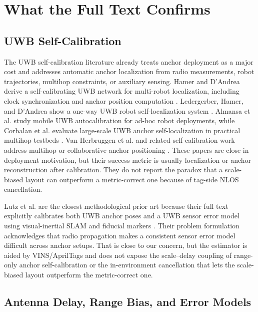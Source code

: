 \documentclass[11pt,a4paper]{article}
\begin{document}
\section{What the Full Text Confirms}

\subsection{UWB Self-Calibration}

The UWB self-calibration literature already treats anchor deployment as a major cost and addresses automatic anchor localization from radio measurements, robot trajectories, multihop constraints, or auxiliary sensing. Hamer and D'Andrea derive a self-calibrating UWB network for multi-robot localization, including clock synchronization and anchor position computation \citep{hamer_2018_self_calibrating_ultra_wideband_network}. Ledergerber, Hamer, and D'Andrea show a one-way UWB robot self-localization system \citep{ledergerber_2015_robot_self_localization_one_way_uwb}. Almansa et al. study mobile UWB autocalibration for ad-hoc robot deployments, while Corbalan et al. evaluate large-scale UWB anchor self-localization in practical multihop testbeds \citep{almansa_2020_autocalibration_mobile_uwb_localization,corbalan_2023_self_localization_uwb_anchors}. Van Herbruggen et al. and related self-calibration work address multihop or collaborative anchor positioning \citep{herbruggen_2023_multihop_self_calibration_algori,ridolfi_2021_self_calibration_and_collaborati,shi_2019_anchor_self_localization_algorit}. These papers are close in deployment motivation, but their success metric is usually localization or anchor reconstruction after calibration. They do not report the paradox that a scale-biased layout can outperform a metric-correct one because of tag-side NLOS cancellation.

Lutz et al. are the closest methodological prior art because their full text explicitly calibrates both UWB anchor poses and a UWB sensor error model using visual-inertial SLAM and fiducial markers \citep{lutz_2019_visual_inertial_slam_uwb_error_model}. Their problem formulation acknowledges that radio propagation makes a consistent sensor error model difficult across anchor setups. That is close to our concern, but the estimator is aided by VINS/AprilTags and does not expose the scale--delay coupling of range-only anchor self-calibration or the in-environment cancellation that lets the scale-biased layout outperform the metric-correct one.

\subsection{Antenna Delay, Range Bias, and Error Models}
\end{document}
